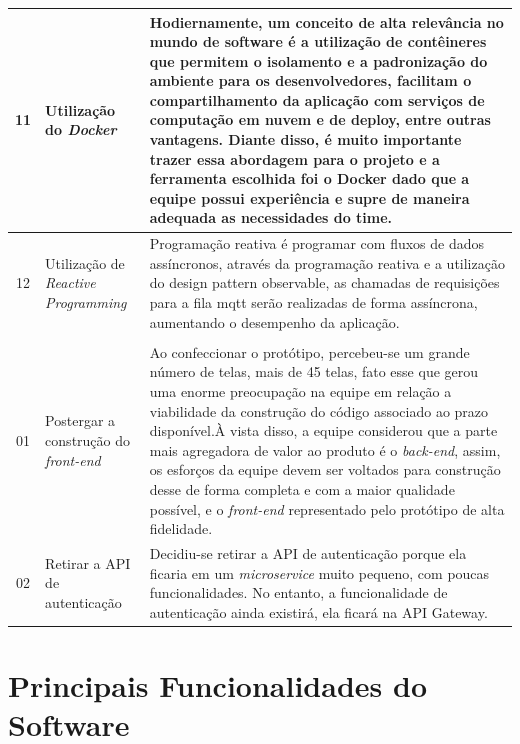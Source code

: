 \begin{apendicesenv}
\begin{table}[H]
\begin{adjustbox}{max width = \textwidth}
\begin{tabular}{|c|p{5cm}|p{10cm}|}
            \hline
            11 & Utilização do \textit{Docker} & Hodiernamente, um conceito de alta relevância no mundo de software é a utilização de contêineres que permitem o isolamento e a padronização do ambiente para os desenvolvedores, facilitam o compartilhamento da aplicação com serviços de computação em nuvem e de deploy, entre outras vantagens. Diante disso, é muito importante trazer essa abordagem para o projeto e a ferramenta escolhida foi o Docker dado que a equipe possui experiência e supre de maneira adequada as necessidades do time.  \\ 
            \hline
            12 & Utilização de \textit{Reactive Programming} & Programação reativa é programar com fluxos de dados assíncronos, através da programação reativa e a utilização do design pattern observable, as chamadas de requisições para a fila mqtt serão realizadas de forma assíncrona, aumentando o desempenho da aplicação. \\ 
            \hline
             \rowcolor[HTML]{1D3557}\multicolumn{3}{|c|}{\textbf{\color{white}Ponto de Controle 2}} \\
             
             \hline
            01 & Postergar a construção do \textit{front-end} & Ao confeccionar o protótipo, percebeu-se um grande número de telas, mais de 45 telas, fato esse que gerou uma enorme preocupação na equipe em relação a viabilidade da construção do código associado ao prazo disponível.À vista disso, a equipe considerou que a parte mais agregadora de valor ao produto é o \textit{back-end}, assim, os esforços da equipe devem ser voltados para construção desse de forma completa e com a maior qualidade possível, e o \textit{front-end} representado pelo protótipo de alta fidelidade. \\ 
            \hline 02 & Retirar a API de autenticação & Decidiu-se retirar a API de autenticação porque ela ficaria em um \textit{microservice} muito pequeno, com poucas funcionalidades. No entanto, a funcionalidade de autenticação ainda existirá, ela ficará na API Gateway. \\
            \hline
        \end{tabular}
    \end{adjustbox}
\end{table}

\chapter{Principais Funcionalidades do Software}\label{principais_funcionalidades_software}

\end{apendicesenv}
